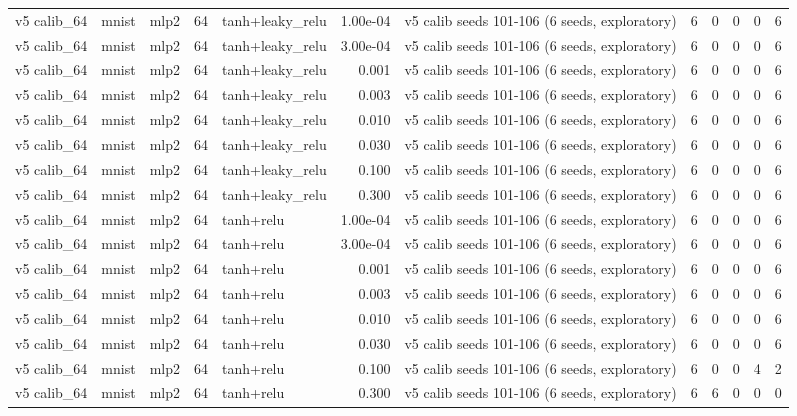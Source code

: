 \begin{table}[htbp]
{\begin{tabular}{@{}lllrlrlrrrrr@{}}
v5 calib\_64 & mnist & mlp2 & 64 & tanh+leaky\_relu & 1.00e-04 & v5 calib seeds 101-106 (6 seeds, exploratory) & 6 & 0 & 0 & 0 & 6 \\
v5 calib\_64 & mnist & mlp2 & 64 & tanh+leaky\_relu & 3.00e-04 & v5 calib seeds 101-106 (6 seeds, exploratory) & 6 & 0 & 0 & 0 & 6 \\
v5 calib\_64 & mnist & mlp2 & 64 & tanh+leaky\_relu & 0.001 & v5 calib seeds 101-106 (6 seeds, exploratory) & 6 & 0 & 0 & 0 & 6 \\
v5 calib\_64 & mnist & mlp2 & 64 & tanh+leaky\_relu & 0.003 & v5 calib seeds 101-106 (6 seeds, exploratory) & 6 & 0 & 0 & 0 & 6 \\
v5 calib\_64 & mnist & mlp2 & 64 & tanh+leaky\_relu & 0.010 & v5 calib seeds 101-106 (6 seeds, exploratory) & 6 & 0 & 0 & 0 & 6 \\
v5 calib\_64 & mnist & mlp2 & 64 & tanh+leaky\_relu & 0.030 & v5 calib seeds 101-106 (6 seeds, exploratory) & 6 & 0 & 0 & 0 & 6 \\
v5 calib\_64 & mnist & mlp2 & 64 & tanh+leaky\_relu & 0.100 & v5 calib seeds 101-106 (6 seeds, exploratory) & 6 & 0 & 0 & 0 & 6 \\
v5 calib\_64 & mnist & mlp2 & 64 & tanh+leaky\_relu & 0.300 & v5 calib seeds 101-106 (6 seeds, exploratory) & 6 & 0 & 0 & 0 & 6 \\
v5 calib\_64 & mnist & mlp2 & 64 & tanh+relu & 1.00e-04 & v5 calib seeds 101-106 (6 seeds, exploratory) & 6 & 0 & 0 & 0 & 6 \\
v5 calib\_64 & mnist & mlp2 & 64 & tanh+relu & 3.00e-04 & v5 calib seeds 101-106 (6 seeds, exploratory) & 6 & 0 & 0 & 0 & 6 \\
v5 calib\_64 & mnist & mlp2 & 64 & tanh+relu & 0.001 & v5 calib seeds 101-106 (6 seeds, exploratory) & 6 & 0 & 0 & 0 & 6 \\
v5 calib\_64 & mnist & mlp2 & 64 & tanh+relu & 0.003 & v5 calib seeds 101-106 (6 seeds, exploratory) & 6 & 0 & 0 & 0 & 6 \\
v5 calib\_64 & mnist & mlp2 & 64 & tanh+relu & 0.010 & v5 calib seeds 101-106 (6 seeds, exploratory) & 6 & 0 & 0 & 0 & 6 \\
v5 calib\_64 & mnist & mlp2 & 64 & tanh+relu & 0.030 & v5 calib seeds 101-106 (6 seeds, exploratory) & 6 & 0 & 0 & 0 & 6 \\
v5 calib\_64 & mnist & mlp2 & 64 & tanh+relu & 0.100 & v5 calib seeds 101-106 (6 seeds, exploratory) & 6 & 0 & 0 & 4 & 2 \\
v5 calib\_64 & mnist & mlp2 & 64 & tanh+relu & 0.300 & v5 calib seeds 101-106 (6 seeds, exploratory) & 6 & 6 & 0 & 0 & 0 \\

\end{tabular}}
\end{table}
